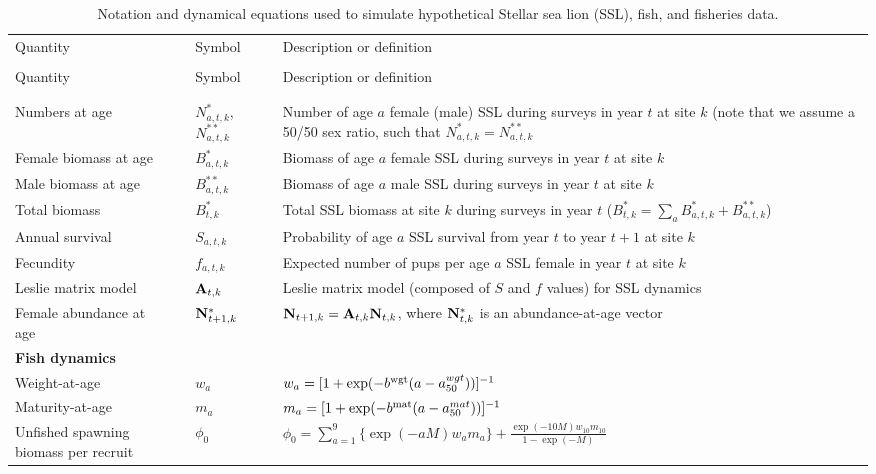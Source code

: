 \documentclass[nonumbib,leqno]{nrc1}
\begin{document}
\begin{longtable}{p{4cm}lll p{8cm}}
\caption[Population \& Fisheries dynamics]{\large Notation and dynamical equations used to simulate
 hypothetical Stellar sea lion (SSL), fish, and fisheries data.} \label{tab:model} \\
\hline \hline 
Quantity & & Symbol & & Description or definition \\
\cline{1-1} \cline{3-3} \cline{5-5} \\
\endfirsthead
\hline \hline
Quantity & & Symbol & & Description or definition \\
\cline{1-1} \cline{3-3} \cline{5-5} \\
\endhead
\hline
\endfoot
\hline
\endlastfoot
\multicolumn{1}{l}{\textbf{Stellar sea lion dynamics}}\\
Numbers at age & & $N_{a,t,k}^*$,$N_{a,t,k}^{**}$ & & Number of age $a$ female (male) SSL during surveys in year $t$ at site $k$ (note that we assume a 50/50 sex ratio, such that $N_{a,t,k}^*=N_{a,t,k}^{**}$\\
Female biomass at age & & $B_{a,t,k}^*$ & & Biomass of age $a$ female SSL during surveys in year $t$ at site $k$\\
Male biomass at age & & $B_{a,t,k}^{**}$ & & Biomass of age $a$ male SSL during surveys in year $t$ at site $k$\\
Total biomass & & $B_{t,k}^*$ & & Total SSL biomass at site $k$ during surveys in year $t$ ($B_{t,k}^*=\sum_a B_{a,t,k}^*+B_{a,t,k}^{**}$) \\
Annual survival & & $S_{a,t,k}$ & & Probability of age $a$ SSL survival from year $t$ to year $t+1$ at site $k$ \\
Fecundity & & $f_{a,t,k}$ & & Expected number of pups per age $a$ SSL female in year $t$ at site $k$ \\
Leslie matrix model & & ${\bf A}_{t,k}$ & & Leslie matrix model (composed of $S$ and $f$ values) for SSL dynamics \\
Female abundance at age & & ${\bf N}_{t+1,k}^*$ & & ${\bf N}_{t+1,k}={\bf A}_{t,k} {\bf N}_{t,k}$, where \newline ${\bf N}_{t,k}^*$ is an abundance-at-age vector \\
\midrule
\multicolumn{1}{l}{\textbf{Fish dynamics}}\\
Weight-at-age & & $w_a$ & & $w_a = [ 1 + \exp(-b^{\rm wgt}(a-a_{50}^{wgt})) ]^{-1}$ \\
Maturity-at-age & & $m_a$ & & $m_a = [ 1 + \exp(-b^{\rm mat}(a-a_{50}^{mat})) ]^{-1}$ \\
Unfished spawning biomass per recruit & & $\phi_0$ & & $\phi_0=\sum_{a=1}^9 \{ \exp(-aM) w_a m_a \} + \frac{\exp(-10M) w_{10} m_{10}}{1-\exp(-M)}$ \\


\end{longtable}
\end{document}

